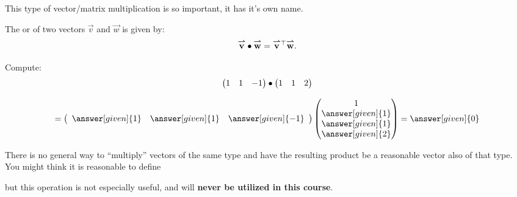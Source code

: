 \documentclass{ximera}
\begin{document}
This type of vector/matrix multiplication is so important, it has it's own name.

\begin{definition}
  The  or  of two vectors
  $\vec{v}$ and $\vec{w}$ is given by:
  \[
  {\overset{\boldsymbol{\rightharpoonup}}{\mathbf{v}}}\hspace{0in}\bullet {\overset{\boldsymbol{\rightharpoonup}}{\mathbf{w}}}\hspace{0in} =  {\overset{\boldsymbol{\rightharpoonup}}{\mathbf{v}}}\hspace{0in}^\top {\overset{\boldsymbol{\rightharpoonup}}{\mathbf{w}}}\hspace{0in}.
  \]
\end{definition}



\begin{question}
  Compute:
  \[
  \begin{pmatrix} 1 & 1 & -1 \end{pmatrix}
  \bullet\begin{pmatrix} 1 & 1 & 2\end{pmatrix}\]
  \begin{prompt}
     \[=\left(\begin{array}{ccc} \answer[given]{1} & \answer[given]{1} & \answer[given]{-1}\end{array}\right) \begin{pmatrix} 1\\
    \answer[given]{1}\\
    \answer[given]{1}\\
    \answer[given]{2}
    \end{pmatrix}= \answer[given]{0}
    \]
  \end{prompt}
\end{question}




\begin{warning}
  There is no general way to ``multiply'' vectors of the same type and
  have the resulting product be a reasonable vector also of that type.
  You might think it is reasonable to define
  \begin{center}
  \end{center}
but this operation is not especially useful, and will \textbf{never be
  utilized in this course}.
\end{warning}
\end{document}
